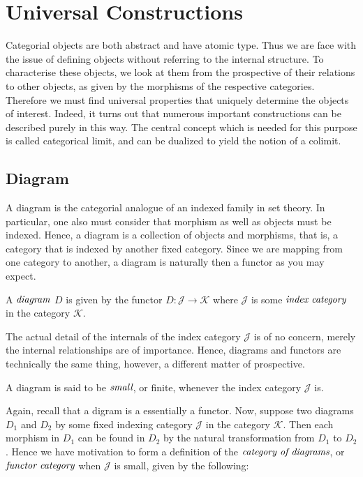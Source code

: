 \section{Universal Constructions} %
\label{sec:universalconstructions}
Categorial objects are both abstract and have atomic type.
Thus we are face with the issue of defining objects without referring to the internal structure.
To characterise these objects, we look at them from the prospective of their relations to other objects, as given by the morphisms 
of the respective categories. Therefore we must find universal properties that uniquely determine the objects of interest.
Indeed, it turns out that numerous important constructions can be described purely in this way.
The central concept which is needed for this purpose is called categorical limit, and can be dualized to yield the notion of a colimit.

\subsection{Diagram} %
\label{subsec:diagram}
A diagram is the categorial analogue of an indexed family in set theory. In particular, one also must consider that
morphism as well as objects must be indexed. Hence, a diagram is a collection of objects and morphisms, that is,
a category that is indexed by another fixed category. Since we are mapping from one category to another, a diagram is
naturally then a functor as you may expect.
\begin{defn}[Diagram]
 A $\emph{diagram}$ $D$ is given by the functor $D: \mathcal{J} \to \mathcal{K}$
 where $\mathcal{J}$ is some $\emph{index category}$ in the category $\mathcal{K}$.
\end{defn}

The actual detail of the internals of the index category $\mathcal{J}$ is of no concern, merely the internal relationships
are of importance. Hence, diagrams and functors are technically the same thing, however, a different matter of prospective.

\begin{cor}
 A diagram is said to be $\emph{small}$, or finite, whenever the index category $\mathcal{J}$ is.
\end{cor}

Again, recall that a digram is a essentially a functor.
Now, suppose two diagrams $D_{1}$ and $D_{2}$ by some fixed indexing category $\mathcal{J}$ in the category $\mathcal{K}$.
Then each morphism in $D_{1}$ can be found in $D_{2}$ by the natural transformation from $D_{1}$ to $D_{2}$.
Hence we have motivation to form a definition of the $\emph{category of diagrams}$, or $\emph{functor category}$ when
$\mathcal{J}$ is small, given by the following:

